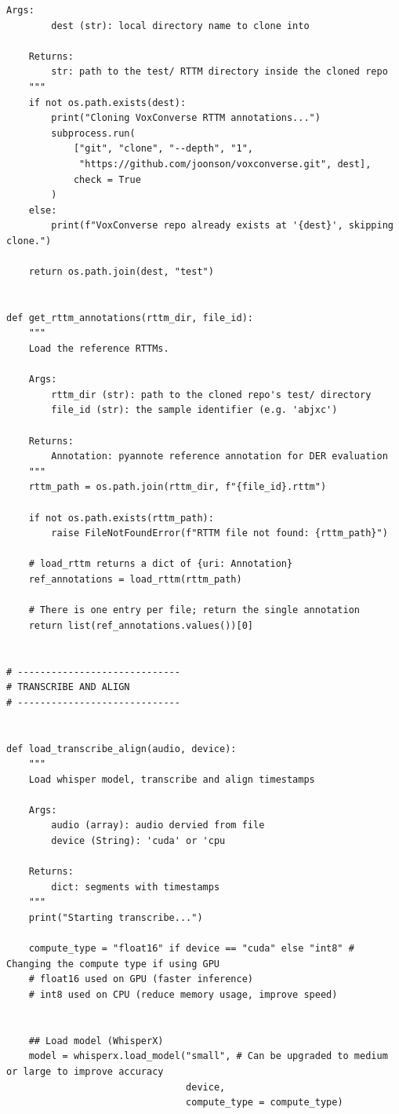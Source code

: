 \documentclass{article}
\begin{document}
\begin{lstlisting}[style=pythonstyle, caption={LLM-backed diarization}]
    Args:
        dest (str): local directory name to clone into
 
    Returns:
        str: path to the test/ RTTM directory inside the cloned repo
    """
    if not os.path.exists(dest):
        print("Cloning VoxConverse RTTM annotations...")
        subprocess.run(
            ["git", "clone", "--depth", "1",
             "https://github.com/joonson/voxconverse.git", dest],
            check = True
        )
    else:
        print(f"VoxConverse repo already exists at '{dest}', skipping clone.")
 
    return os.path.join(dest, "test")


def get_rttm_annotations(rttm_dir, file_id):
    """
    Load the reference RTTMs.
 
    Args:
        rttm_dir (str): path to the cloned repo's test/ directory
        file_id (str): the sample identifier (e.g. 'abjxc')
 
    Returns:
        Annotation: pyannote reference annotation for DER evaluation
    """
    rttm_path = os.path.join(rttm_dir, f"{file_id}.rttm")
 
    if not os.path.exists(rttm_path):
        raise FileNotFoundError(f"RTTM file not found: {rttm_path}")
 
    # load_rttm returns a dict of {uri: Annotation}
    ref_annotations = load_rttm(rttm_path)
 
    # There is one entry per file; return the single annotation
    return list(ref_annotations.values())[0]


# -----------------------------
# TRANSCRIBE AND ALIGN
# -----------------------------


def load_transcribe_align(audio, device):
    """ 
    Load whisper model, transcribe and align timestamps

    Args:
        audio (array): audio dervied from file
        device (String): 'cuda' or 'cpu

    Returns:
        dict: segments with timestamps
    """
    print("Starting transcribe...")

    compute_type = "float16" if device == "cuda" else "int8" # Changing the compute type if using GPU
    # float16 used on GPU (faster inference)
    # int8 used on CPU (reduce memory usage, improve speed)


    ## Load model (WhisperX)
    model = whisperx.load_model("small", # Can be upgraded to medium or large to improve accuracy
                                device,
                                compute_type = compute_type)


\end{lstlisting}
\end{document}
